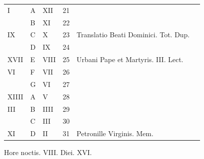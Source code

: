 \begin{center}
\begin{tabular}{l | l | l | r | l l}
\color{Red} I & \color{Red} A & \color{Red} XII & 21 & & \color{Red} \\
\color{Red}  & B & \color{Red} XI & 22 & & \color{Red} \\
\color{Red} IX & C & \color{Red} X & 23 & Translatio Beati Dominici. Tot. Dup. & \color{Red} \\
\color{Red}  & D & \color{Red} IX & 24 & & \color{Red} \\
\color{Red} XVII & E & \color{Red} VIII & 25 & Urbani Pape et Martyris. III. Lect. & \color{Red} \\
\color{Red} VI & F & \color{Red} VII & 26 & & \color{Red} \\
\color{Red}  & G & \color{Red} VI & 27 & & \color{Red} \\
\color{Red} XIIII & \color{Red} A & \color{Red} V & 28 & & \color{Red} \\
\color{Red} III & B & \color{Red} IIII & 29 & & \color{Red} \\
\color{Red}  & C & \color{Red} III & 30 & & \color{Red} \\
\color{Red} XI & D & \color{Red} II & 31 & Petronille Virginis. Mem. & \color{Red} \\
\end{tabular}
\newline \color{Red} Hore noctis. VIII. Diei. XVI.
\end{center}



\newpage
\color{Red}\color{black}

